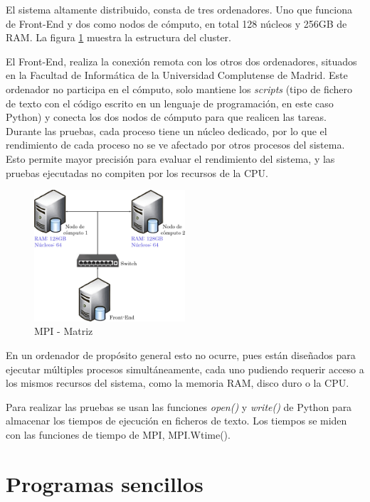 El sistema altamente distribuido, consta de tres ordenadores. Uno que funciona de Front-End y dos como nodos de cómputo, en total 128 núcleos y 256GB de RAM. La figura \ref{fig:cluster} muestra la estructura del cluster.




El Front-End, realiza la conexión remota con los otros dos ordenadores, situados en la Facultad de Informática de la Universidad Complutense de Madrid. Este ordenador no participa en el cómputo, solo mantiene los \textit{scripts} (tipo de fichero de texto con el código escrito en un lenguaje de programación, en este caso Python) y conecta los dos nodos de cómputo para que realicen las tareas.  Durante las pruebas, cada proceso tiene un núcleo dedicado, por lo que el rendimiento de cada proceso no se ve afectado por otros procesos del sistema. Esto permite mayor precisión para evaluar el rendimiento del sistema, y las pruebas ejecutadas no compiten por los recursos de la CPU. 


\vspace*{0.2cm}

\begin{figure}[!h]
	\centering
	\includegraphics[width=0.5\textwidth]{images/chapter_4/cluster}
	\caption{MPI - Matriz}
	\label{fig:cluster}
\end{figure}

En un ordenador de propósito general esto no ocurre, pues están diseñados para ejecutar múltiples procesos simultáneamente, cada uno pudiendo requerir acceso a los mismos recursos del sistema, como la memoria RAM, disco duro o la CPU.

Para realizar las pruebas se usan las funciones \textit{open()} y \textit{write()} de Python para almacenar los tiempos de ejecución en ficheros de texto. Los tiempos se miden con las funciones de
tiempo de MPI, MPI.Wtime().

\section{Programas sencillos}

